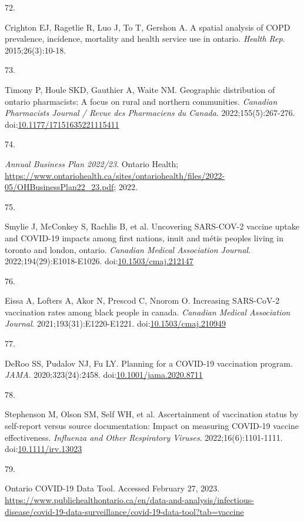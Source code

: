 \documentclass[
]{article}
\newlength{\cslhangindent}
\newlength{\csllabelwidth}
\newlength{\cslentryspacingunit} %
\newenvironment{CSLReferences}[2] %
 {%
  \setlength{\parindent}{0pt}
  \ifodd #1
  \let\oldpar\par
  \def\par{\hangindent=\cslhangindent\oldpar}
  \fi
  \setlength{\parskip}{#2\cslentryspacingunit}
 }%
 {}
\newcommand{\CSLLeftMargin}[1]{\parbox[t]{\csllabelwidth}{#1}}
\newcommand{\CSLRightInline}[1]{\parbox[t]{\linewidth - \csllabelwidth}{#1}\break}
\begin{document}
\begin{CSLReferences}{0}{0}
\leavevmode{}%
\CSLLeftMargin{72. }%
\CSLRightInline{Crighton EJ, Ragetlie R, Luo J, To T, Gershon A. A
spatial analysis of {COPD} prevalence, incidence, mortality and health
service use in ontario. \emph{Health Rep}. 2015;26(3):10-18.}

\leavevmode{}%
\CSLLeftMargin{73. }%
\CSLRightInline{Timony P, Houle SKD, Gauthier A, Waite NM. Geographic
distribution of ontario pharmacists: A focus on rural and northern
communities. \emph{Canadian Pharmacists Journal / Revue des Pharmaciens
du Canada}. 2022;155(5):267-276.
doi:\href{https://doi.org/10.1177/17151635221115411}{10.1177/17151635221115411}}

\leavevmode{}%
\CSLLeftMargin{74. }%
\CSLRightInline{\emph{{A}nnual {B}usiness {P}lan 2022/23}. Ontario
Health;
\url{https://www.ontariohealth.ca/sites/ontariohealth/files/2022-05/OHBusinessPlan22_23.pdf};
2022.}

\leavevmode{}%
\CSLLeftMargin{75. }%
\CSLRightInline{Smylie J, McConkey S, Rachlis B, et al. Uncovering
{SARS}-{COV}-2 vaccine uptake and {COVID}-19 impacts among first
nations, inuit and m{é}tis peoples living in toronto and london,
ontario. \emph{Canadian Medical Association Journal}.
2022;194(29):E1018-E1026.
doi:\href{https://doi.org/10.1503/cmaj.212147}{10.1503/cmaj.212147}}

\leavevmode{}%
\CSLLeftMargin{76. }%
\CSLRightInline{Eissa A, Lofters A, Akor N, Prescod C, Nnorom O.
Increasing {SARS}-{CoV}-2 vaccination rates among black people in
canada. \emph{Canadian Medical Association Journal}.
2021;193(31):E1220-E1221.
doi:\href{https://doi.org/10.1503/cmaj.210949}{10.1503/cmaj.210949}}

\leavevmode{}%
\CSLLeftMargin{77. }%
\CSLRightInline{DeRoo SS, Pudalov NJ, Fu LY. Planning for a {COVID}-19
vaccination program. \emph{{JAMA}}. 2020;323(24):2458.
doi:\href{https://doi.org/10.1001/jama.2020.8711}{10.1001/jama.2020.8711}}

\leavevmode{}%
\CSLLeftMargin{78. }%
\CSLRightInline{Stephenson M, Olson SM, Self WH, et al. Ascertainment of
vaccination status by self-report versus source documentation: Impact on
measuring {COVID}-19 vaccine effectiveness. \emph{Influenza and Other
Respiratory Viruses}. 2022;16(6):1101-1111.
doi:\href{https://doi.org/10.1111/irv.13023}{10.1111/irv.13023}}

\leavevmode{}%
\CSLLeftMargin{79. }%
\CSLRightInline{{Ontario COVID-19 Data Tool}. Accessed February 27,
2023.
\url{https://www.publichealthontario.ca/en/data-and-analysis/infectious-disease/covid-19-data-surveillance/covid-19-data-tool?tab=vaccine}}

\end{CSLReferences}
\end{document}
